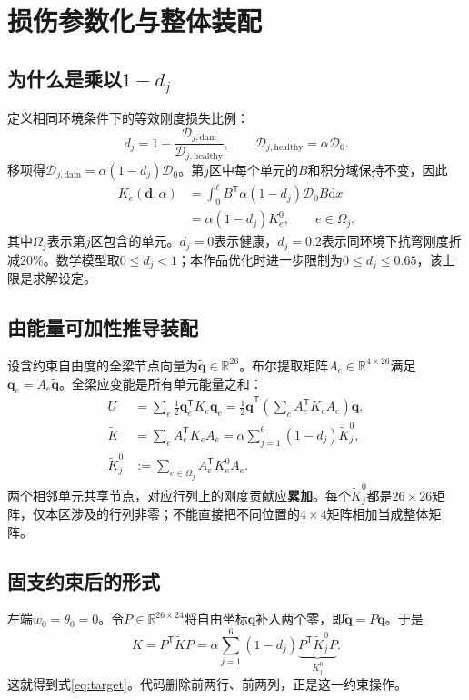\documentclass[UTF8,a4paper,11pt,fontset=fandol]{ctexart}
\numberwithin{equation}{section}
\newcommand{\dd}{\mathrm d}
\newcommand{\T}{^{\mathsf T}}
\newcommand{\EI}{\mathcal D}
\begin{document}
\newpage
\section{损伤参数化与整体装配}
\subsection{为什么是乘以\texorpdfstring{$1-d_j$}{1-dj}}
定义相同环境条件下的等效刚度损失比例：
\begin{equation}
d_j=1-\frac{\EI_{j,\mathrm{dam}}}{\EI_{j,\mathrm{healthy}}},\qquad
\EI_{j,\mathrm{healthy}}=\alpha\EI_0.
\end{equation}
移项得$\EI_{j,\mathrm{dam}}=\alpha(1-d_j)\EI_0$。第$j$区中每个单元的$B$和积分域保持不变，因此
\begin{align}
K_e(\bm d,\alpha)
&=\int_0^\ell B\T\alpha(1-d_j)\EI_0B\dd x\\
&=\alpha(1-d_j)K_e^0,\qquad e\in\Omega_j.
\end{align}
其中$\Omega_j$表示第$j$区包含的单元。$d_j=0$表示健康，$d_j=0.2$表示同环境下抗弯刚度折减20\%。数学模型取$0\le d_j<1$；本作品优化时进一步限制为$0\le d_j\le0.65$，该上限是求解设定。
\subsection{由能量可加性推导装配}
设含约束自由度的全梁节点向量为$\widetilde{\bm q}\in\mathbb R^{26}$。布尔提取矩阵$A_e\in\mathbb R^{4\times26}$满足$\bm q_e=A_e\widetilde{\bm q}$。全梁应变能是所有单元能量之和：
\begin{align}
U&=\sum_e\frac12\bm q_e\T K_e\bm q_e
=\frac12\widetilde{\bm q}\T\left(\sum_e A_e\T K_eA_e\right)\widetilde{\bm q},\\
\widetilde K&=\sum_e A_e\T K_eA_e
=\alpha\sum_{j=1}^{6}(1-d_j)\widetilde K_j^0,\\
\widetilde K_j^0&:=\sum_{e\in\Omega_j}A_e\T K_e^0A_e.
\end{align}
两个相邻单元共享节点，对应行列上的刚度贡献应\textbf{累加}。每个$\widetilde K_j^0$都是$26\times26$矩阵，仅本区涉及的行列非零；不能直接把不同位置的$4\times4$矩阵相加当成整体矩阵。
\subsection{固支约束后的形式}
左端$w_0=\theta_0=0$。令$P\in\mathbb R^{26\times24}$将自由坐标$\bm q$补入两个零，即$\widetilde{\bm q}=P\bm q$。于是
\begin{equation}
K=P\T\widetilde KP
=\alpha\sum_{j=1}^{6}(1-d_j)\underbrace{P\T\widetilde K_j^0P}_{K_j^0}.
\end{equation}
这就得到式\eqref{eq:target}。代码删除前两行、前两列，正是这一约束操作。
\end{document}
